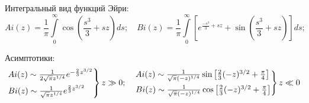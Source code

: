 Интегральный вид функций Эйри:
\[
Ai(z) = \frac{1}{\pi}\int\limits_{0}^{\infty}\cos(\frac{s^3}{3} + sz)ds; \quad Bi(z) = \frac{1}{\pi}\int\limits_{0}^{\infty}\left[e^{\frac{-s^3}{3} + sz} + \sin(\frac{s^3}{3} + sz)\right]ds;
\]

Асимптотики:
\[
\begin{rcases}
    Ai(z) \sim \frac{1}{2\sqrt{\pi}z^{1/4}}e^{-\frac{2}{3}z^{3/2}}\\
    Bi(z) \sim \frac{1}{\sqrt{\pi}z^{1/4}}e^{\frac{2}{3}z^{3/2}}
\end{rcases}
 z \gg 0;\quad
 \begin{rcases}
    Ai(z) \sim \frac{1}{\sqrt{\pi}(-z)^{1/4}}\sin\left[\frac{2}{3}(-z)^{3/2} + \frac{\pi}{4}\right]\\
    Bi(z) \sim \frac{1}{\sqrt{\pi}(-z)^{1/4}}\cos\left[\frac{2}{3}(-z)^{3/2} + \frac{\pi}{4}\right]
\end{rcases}
z\ll 0
\]

